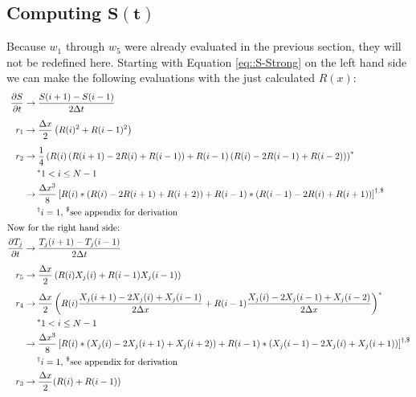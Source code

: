 \documentclass{article}
\def\pd{\partial}
\begin{document}
\subsection{Computing $\mathbf{S(t)}$}
Because $w_1$ through $w_5$ were already evaluated in the previous section, they will not be redefined here. Starting with Equation \ref{eq::S-Strong} on the left hand side we can make the following evaluations with the just calculated $R(x)$:
\begin{subequations}
\begin{align*}
\frac{\pd S}{\pd t} &\to \frac{S(i+1) - S(i-1)}{2\Delta t} \\[5pt]
r_1 &\to \frac{\Delta x}{2} \left( R(i)^2 + R(i-1)^2 \right) \\[5pt]
r_2 &\to \frac{1}{4} \left( R(i) \left( R(i+1)-2R(i)+R(i-1) \right) + R(i-1) \left( R(i)-2R(i-1)+R(i-2) \right) \right)^*\\
    & \text{$\quad\:\:^*1<i\leq N-1$} \\
    &\to \frac{\Delta x^3}{8} \left[ R(i)*\left( R(i)-2R(i+1)+R(i+2)\right) + R(i-1)*\left( R(i-1)-2R(i)+R(i+1)\right)\right]^{\dagger,\$}\\
    & \text{$\quad\:\:^\dagger i=1$, $^\$$see appendix for derivation}\\
\intertext{Now for the right hand side:}
\frac{\pd T_j}{\pd t} &\to \frac{T_j(i+1)-T_j(i-1)}{2\Delta t} \\[5pt]
r_5 &\to \frac{\Delta x}{2} \left( R(i)X_j(i) + R(i-1)X_j(i-1) \right) \\[5pt]
r_4 &\to \frac{\Delta x}{2} \left( R(i)\frac{X_j(i+1)-2X_j(i)+X_j(i-1)}{2\Delta x} + R(i-1)\frac{X_j(i)-2X_j(i-1)+X_j(i-2)}{2\Delta x} \right)^*\\
    & \text{$\quad\:\:^*1<i\leq N-1$} \\
    &\to \frac{\Delta x^3}{8} \left[ R(i)*\left( X_j(i)-2X_j(i+1)+X_j(i+2)\right) + R(i-1)*\left( X_j(i-1)-2X_j(i)+X_j(i+1)\right)\right]^{\dagger,\$}\\
    & \text{$\quad\:\:^\dagger i=1$, $^\$$see appendix for derivation}\\
r_3  &\to \frac{\Delta x}{2} (R(i) + R(i-1)) \\[5pt]
\end{align*}
\end{subequations}
\end{document}
